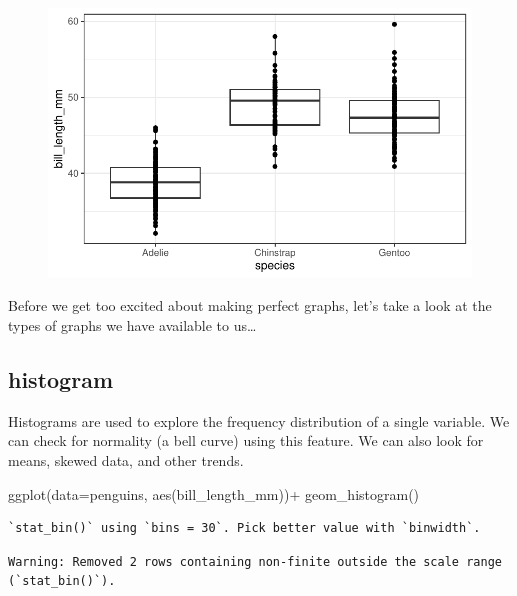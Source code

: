 \documentclass[
  letterpaper,
  DIV=11,
  numbers=noendperiod]{scrartcl}
\newenvironment{Shaded}{\begin{snugshade}}{\end{snugshade}}
\newcommand{\AttributeTok}[1]{\textcolor[rgb]{0.40,0.45,0.13}{#1}}
\newcommand{\FunctionTok}[1]{\textcolor[rgb]{0.28,0.35,0.67}{#1}}
\newcommand{\NormalTok}[1]{\textcolor[rgb]{0.00,0.23,0.31}{#1}}
\newcommand{\SpecialCharTok}[1]{\textcolor[rgb]{0.37,0.37,0.37}{#1}}
\begin{document}
\begin{figure}[H]

{\centering \includegraphics{Lab_2_files/figure-pdf/unnamed-chunk-5-1.pdf}

}

\end{figure}

Before we get too excited about making perfect graphs, let's take a look
at the types of graphs we have available to us\ldots{}

\subsection{\texorpdfstring{\textbf{histogram}}{histogram}}

Histograms are used to explore the frequency distribution of a single
variable. We can check for normality (a bell curve) using this feature.
We can also look for means, skewed data, and other trends.

\begin{Shaded}
\begin{Highlighting}[]
\FunctionTok{ggplot}\NormalTok{(}\AttributeTok{data=}\NormalTok{penguins, }\FunctionTok{aes}\NormalTok{(bill\_length\_mm))}\SpecialCharTok{+}
  \FunctionTok{geom\_histogram}\NormalTok{()}
\end{Highlighting}
\end{Shaded}

\begin{verbatim}
`stat_bin()` using `bins = 30`. Pick better value with `binwidth`.
\end{verbatim}

\begin{verbatim}
Warning: Removed 2 rows containing non-finite outside the scale range
(`stat_bin()`).
\end{verbatim}
\end{document}
